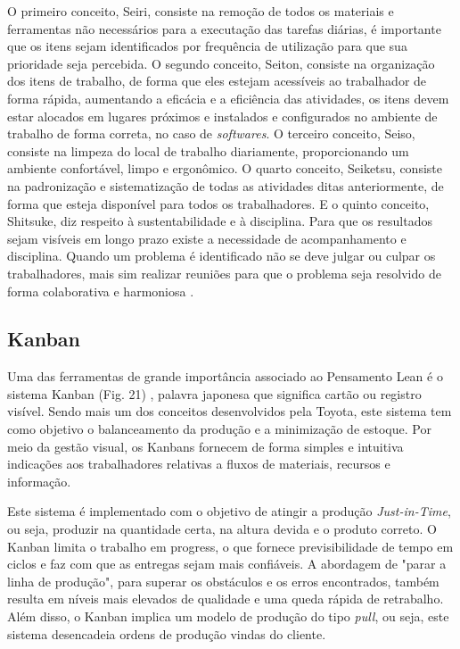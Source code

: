 \begin{anexosenv}
O primeiro conceito, Seiri, consiste na  remoção de todos os materiais e ferramentas não necessários para a executação das tarefas diárias, é importante que os itens sejam identificados por frequência de utilização para que sua prioridade seja percebida.  O segundo conceito, Seiton, consiste na organização dos itens de trabalho, de forma que eles estejam acessíveis ao trabalhador de forma rápida, aumentando a eficácia e  a eficiência das atividades, os itens devem estar alocados em lugares próximos e instalados e configurados no ambiente de trabalho de forma correta, no caso de \textit{softwares}. O terceiro conceito, Seiso, consiste na limpeza do local de trabalho diariamente, proporcionando um ambiente confortável, limpo e ergonômico. O quarto conceito, Seiketsu, consiste na padronização e sistematização de todas as atividades ditas anteriormente, de forma que esteja disponível para todos os trabalhadores. E o quinto conceito, Shitsuke, diz respeito à sustentabilidade e à disciplina. Para que os resultados sejam visíveis em longo prazo existe a necessidade de acompanhamento e disciplina. Quando um problema é identificado não se deve julgar ou culpar os trabalhadores, mais sim realizar reuniões para que o problema seja resolvido de forma colaborativa e harmoniosa  \cite{bell2011}. 

\subsection[Kanban]{Kanban}

Uma das ferramentas de grande importância associado ao Pensamento Lean é o sistema Kanban (Fig. 21) , palavra japonesa que significa cartão ou registro visível. Sendo mais um dos conceitos desenvolvidos pela Toyota, este sistema tem como objetivo o balanceamento da produção e a minimização de estoque. Por meio da gestão visual, os Kanbans fornecem de forma simples e intuitiva indicações aos trabalhadores relativas a fluxos de materiais, recursos e informação. 

Este sistema é implementado com o objetivo de atingir a produção \textit{Just-in-Time}, ou seja, produzir na quantidade certa, na altura devida e o produto correto. O Kanban limita o trabalho em progress, o que fornece previsibilidade de tempo em ciclos e faz com que as entregas sejam mais confiáveis. A abordagem de "parar a linha de produção", para superar os obstáculos e os erros encontrados, também resulta em níveis mais elevados de qualidade e uma queda rápida de retrabalho. Além disso, o Kanban implica um modelo de produção do tipo \textit{pull}, ou seja, este sistema desencadeia ordens de produção vindas do cliente\cite{rodrigues2012}.  


\end{anexosenv}
